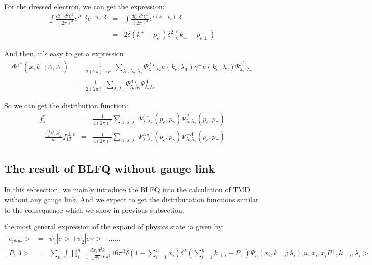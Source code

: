 \documentclass[a4paper,12pt]{article}
\begin{document}
For the dressed electron, we can get the expression:
\begin{eqnarray}
\int \frac{d\xi^- d^2\xi^{\perp}}{(2\pi)^3}e^{ik \cdot \xi} e^{-ip_e \cdot \xi} &=& \int \frac{d\xi^- d^2\xi^{\perp}}{(2\pi)^3} e^{i(k-p_e) \cdot \xi}\nonumber\\
&=& 2\delta(k^+-p_e^+)\delta^2(k_{\perp}-p_{e\perp})\label{eq3.3}
\end{eqnarray}

And then, it's easy to get a expression:
\begin{eqnarray}
\Phi^{\gamma^+}(x,k_{\perp};\Lambda,\Lambda^{\prime}) &=& \frac{1}{2(2\pi)^3 xP^+} \sum_{\lambda_1,\lambda_2,\lambda_{\gamma}} \Psi^{\Lambda \star}_{\lambda_1,\lambda_{\gamma}}\bar{u}(k_e,\lambda_1)\gamma^+u(k_e,\lambda_2)\Psi^{\Lambda^{\prime}}_{\lambda_2,\lambda_{\gamma}}\nonumber\\
&=& \frac{1}{2(2\pi)^3} \sum_{\lambda,\lambda_{\gamma}} \Psi^{\Lambda \star}_{\lambda,\lambda_{\gamma}}\Psi^{\Lambda^{\prime}}_{\lambda,\lambda_{\gamma}}
\end{eqnarray}

So we can get the distribution function:
\begin{eqnarray}
f_1^e &=& \frac{1}{4(2\pi)^3} \sum_{\Lambda,\lambda,\lambda_{\gamma}} \Psi^{\Lambda \star}_{\lambda,\lambda_{\gamma}}(p_e,p_{\gamma})\Psi^{\Lambda}_{\lambda,\lambda_{\gamma}}(p_e,p_{\gamma})\\
-\frac{\epsilon^{ij}_{\perp}k_{\perp}^i S^j_{\perp}}{m}f^{\perp e}_{1T} &=& \frac{1}{4(2\pi)^3} \sum_{\Lambda,\lambda,\lambda_{\gamma}} \Psi^{\Lambda \star}_{\lambda,\lambda_{\gamma}}(p_e,p_{\gamma})\Psi^{-\Lambda}_{\lambda,\lambda_{\gamma}}(p_e,p_{\gamma})
\end{eqnarray}

\subsection{The result of BLFQ without gauge link}

In this sebsection, we mainly introduce the BLFQ into the calculation of TMD without any gauge link. And we expect to get the distributation functions similar to the consequence which we show in previous subsection.

the most general expression of the expand of physics state ia given by:
\begin{eqnarray}
  |e_{phys}> &=& \psi_1|e> + \psi_2|e\gamma> + ......\nonumber\\
  |P,\Lambda> &=& \sum_n \int \prod_{i=1}^{n} \frac{dx_i d^2k_{\perp i}}{\sqrt{x_i}16\pi^3} 16\pi^3\delta(1-\sum_{i=1}^{n}x_i) \delta^2(\sum_{i=1}^{n} k_{\perp i}-P_{\perp}) \Psi_n(x_i, k_{\perp i};\lambda_i)|n,x_i,x_iP^+,k_{\perp i},\lambda_i>\nonumber
\end{eqnarray}
\end{document}
